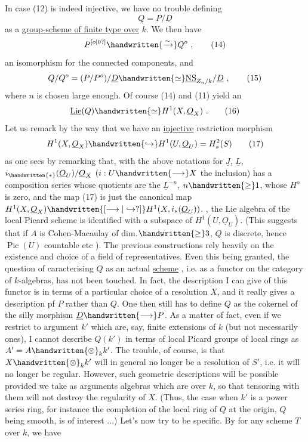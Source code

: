 In case (12) is indeed injective, we have no trouble defining
\[
Q=P/\underline{D}
\tag*{(13)}
\]
as a \uline{group-scheme  of finite type over} $k$. We then have
\[
P^{\unsure{o|0}}\handwritten{\xrightarrow{\sim}}Q^o\ ,
\tag*{(14)}
\]
an isomorphism for the connected components, and
\[
Q/Q^o=(P/P^o)/\underline{D}\handwritten{\simeq}\underline{\operatorname{NS}}_{Z_n/k}/\underline{D}\ ,
\tag*{(15)}
\]
where $n$ is chosen large enough. Of course (14) and (11) yield an 
\[
\underline{\operatorname{Lie}}(Q)\handwritten{\simeq}H^1(X,\underline{O}_X)\ .
\tag*{(16)}
\]
Let us remark by the way that we have an \uline{injective} restriction morphism
\[
H^1(X,\underline{O}_X)\handwritten{\hookrightarrow}H^1(U,\underline{O}_U)=H_s^2(S)
\tag*{(17)}
\]
as one sees by remarking that, with the above notations for $\underline{J}$, $\underline{L}$,   $i_{\handwritten{*}}(\underline{O}_U)/\underline{O}_X$ $(i:U\handwritten{\longrightarrow}X$ the inclusion) has a composition series whose quotients are the $\underline{L}^{-n}$, $n\handwritten{\geq}1$, whose $H^o$ is zero, and the map (17) is just the canonical map $H^1(X,\underline{O}_X)\handwritten{\unsure{\longrightarrow|\hookrightarrow}}H^1(X,i_*(\underline{O}_U))$. , the Lie algebra of the local Picard scheme is identified with a subspace of $H^1(U,\underline{O}_U)$. (This suggests that if $A$ is Cohen-Macaulay of dim.$\handwritten{\geq}3$, $Q$ is discrete, hence $\operatorname{Pic}(U)$ countable etc ).
The previous constructions rely heavily on the existence and choice of a field of representatives. Even this being granted, the question of caracterising $Q$ as an actual \uline{scheme} , i.e. as a functor on the category of $k$-algebras, has not been touched. In fact, the description I can give of this functor is  in terms of a particular choice of a resolution $X$, and it really gives  a description pf $P$ rather than $Q$.  One then still has to define $Q$ as the cokernel of the silly morphism $\underline{D}\handwritten{\longrightarrow}P$. As a matter of fact, even if we restrict to argument $k'$ which are, say, finite extensions of $k$ (but not necessarily  ones), I cannot describe $Q(k')$ in terms of local Picard groups of local rings as $A'=A\handwritten{\otimes}_k k'$. The trouble, of course, is that $X\handwritten{\otimes}_k k'$ will in general no longer be a resolution of $S'$, i.e. it will no longer be regular. However, such geometric descriptions will be possible provided we take as arguments algebras which are  over $k$, so  that tensoring with them will not destroy the regularity of $X$. (Thus, the case when $k'$ is a power series ring, for instance the completion of the local ring of $Q$ at the origin, $Q$ being smooth, is of interest ...) Let's now try to be specific. By   for any  scheme $T$ over $k$, we have
